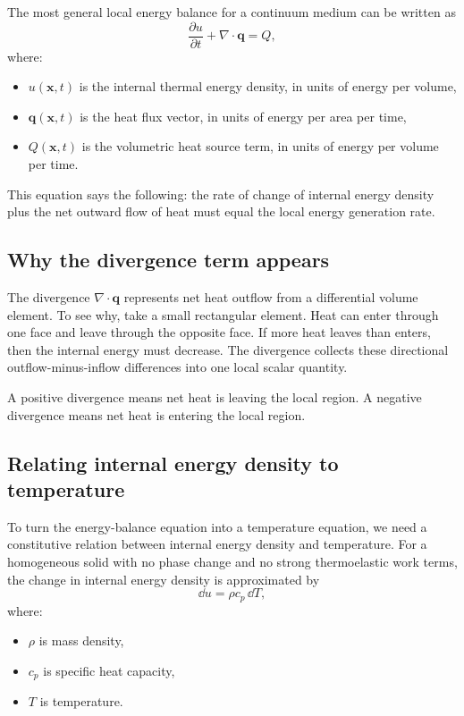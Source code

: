 \documentclass[11pt]{article}
\newcommand{\qvec}{\mathbf{q}}
\newcommand{\xvec}{\mathbf{x}}
\begin{document}
The most general local energy balance for a continuum medium can be written as
\begin{equation}
\frac{\partial u}{\partial t} + \nabla \cdot \qvec = Q,
\end{equation}
where:
\begin{itemize}
    \item $u(\xvec,t)$ is the internal thermal energy density, in units of energy per volume,
    \item $\qvec(\xvec,t)$ is the heat flux vector, in units of energy per area per time,
    \item $Q(\xvec,t)$ is the volumetric heat source term, in units of energy per volume per time.
\end{itemize}

This equation says the following: the rate of change of internal energy density plus the net outward flow of heat must equal the local energy generation rate.

\subsection{Why the divergence term appears}

The divergence $\nabla \cdot \qvec$ represents net heat outflow from a differential volume element. To see why, take a small rectangular element. Heat can enter through one face and leave through the opposite face. If more heat leaves than enters, then the internal energy must decrease. The divergence collects these directional outflow-minus-inflow differences into one local scalar quantity.

A positive divergence means net heat is leaving the local region. A negative divergence means net heat is entering the local region.

\subsection{Relating internal energy density to temperature}

To turn the energy-balance equation into a temperature equation, we need a constitutive relation between internal energy density and temperature. For a homogeneous solid with no phase change and no strong thermoelastic work terms, the change in internal energy density is approximated by
\begin{equation}
\dd u = \rho c_p \, \dd T,
\end{equation}
where:
\begin{itemize}
    \item $\rho$ is mass density,
    \item $c_p$ is specific heat capacity,
    \item $T$ is temperature.
\end{itemize}
\end{document}
